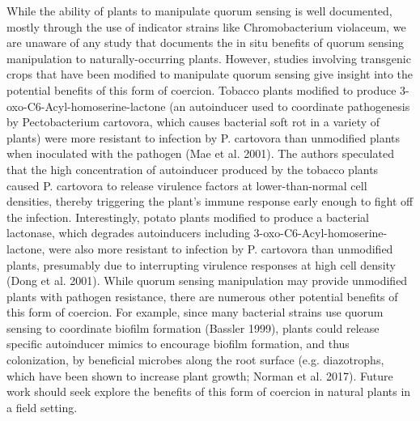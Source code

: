 \documentclass[PhD]{msu-thesis}
\begin{document}
While the ability of plants to manipulate quorum sensing is well documented, mostly through the use of indicator strains like Chromobacterium violaceum, we are unaware of any study that documents the in situ benefits of quorum sensing manipulation to naturally-occurring plants. However, studies involving transgenic crops that have been modified to manipulate quorum sensing give insight into the potential benefits of this form of coercion. Tobacco plants modified to produce 3-oxo-C6-Acyl-homoserine-lactone (an autoinducer used to coordinate pathogenesis by Pectobacterium cartovora, which causes bacterial soft rot in a variety of plants) were more resistant to infection by P. cartovora than unmodified plants when inoculated with the pathogen (Mae et al. 2001). The authors speculated that the high concentration of autoinducer produced by the tobacco plants caused P. cartovora to release virulence factors at lower-than-normal cell densities, thereby triggering the plant’s immune response early enough to fight off the infection. Interestingly, potato plants modified to produce a bacterial lactonase, which degrades autoinducers including 3-oxo-C6-Acyl-homoserine-lactone, were also more resistant to infection by P. cartovora than unmodified plants, presumably due to interrupting virulence responses at high cell density (Dong et al. 2001). While quorum sensing manipulation may provide unmodified plants with pathogen resistance, there are numerous other potential benefits of this form of coercion. For example, since many bacterial strains use quorum sensing to coordinate biofilm formation (Bassler 1999), plants could release specific autoinducer mimics to encourage biofilm formation, and thus colonization, by beneficial microbes along the root surface (e.g. diazotrophs, which have been shown to increase plant growth; Norman et al. 2017). Future work should seek explore the benefits of this form of coercion in natural plants in a field setting.
\end{document}
